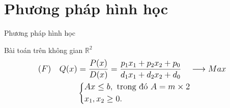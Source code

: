 \documentclass{beamer}
\begin{document}
\section{Phương pháp hình học}
\begin{frame}
   \center 
   \Huge Phương pháp hình học 
\end{frame}

\begin{frame}{Bài toán trên không gian $\mathbb{R}^2$}
\begin{equation} \large
    \begin{split}
    (F) \quad Q(x) & = \frac{P(x)}{D(x)} = \frac{p_1x_1 + p_2 x_2 + p_0}{d_1x_1+d_2x_2 + d_0}\quad \longrightarrow Max \\
        & \left\{
        \begin{split}
        &Ax \leq  b, \text{ trong đó } A=m \times 2 \\
        &x_1, x_2 \geq 0. \\
        \end{split}
        \right.    
    \end{split}
\end{equation}
\end{frame}
\end{document}
